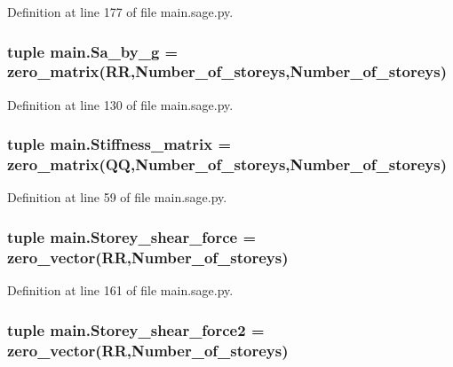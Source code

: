Definition at line 177 of file main.\+sage.\+py.

\hypertarget{namespacemain_a01374e7fea2c00172c845c7a5c71cfae}{}
\subsubsection[{Sa\+\_\+by\+\_\+g}]{\setlength{\rightskip}{0pt plus 5cm}tuple main.\+Sa\+\_\+by\+\_\+g = zero\+\_\+matrix(R\+R,Number\+\_\+of\+\_\+storeys,Number\+\_\+of\+\_\+storeys)}\label{namespacemain_a01374e7fea2c00172c845c7a5c71cfae}


Definition at line 130 of file main.\+sage.\+py.

\hypertarget{namespacemain_a0011be18dbc87087d6aaf28802f121c0}{}
\subsubsection[{Stiffness\+\_\+matrix}]{\setlength{\rightskip}{0pt plus 5cm}tuple main.\+Stiffness\+\_\+matrix = zero\+\_\+matrix(Q\+Q,Number\+\_\+of\+\_\+storeys,Number\+\_\+of\+\_\+storeys)}\label{namespacemain_a0011be18dbc87087d6aaf28802f121c0}


Definition at line 59 of file main.\+sage.\+py.

\hypertarget{namespacemain_aaa52e7055409dcf0785880422294a704}{}
\subsubsection[{Storey\+\_\+shear\+\_\+force}]{\setlength{\rightskip}{0pt plus 5cm}tuple main.\+Storey\+\_\+shear\+\_\+force = zero\+\_\+vector(R\+R,Number\+\_\+of\+\_\+storeys)}\label{namespacemain_aaa52e7055409dcf0785880422294a704}


Definition at line 161 of file main.\+sage.\+py.

\hypertarget{namespacemain_ad9f40bb3020e00eecaf17c078a1e61b6}{}
\subsubsection[{Storey\+\_\+shear\+\_\+force2}]{\setlength{\rightskip}{0pt plus 5cm}tuple main.\+Storey\+\_\+shear\+\_\+force2 = zero\+\_\+vector(R\+R,Number\+\_\+of\+\_\+storeys)}\label{namespacemain_ad9f40bb3020e00eecaf17c078a1e61b6}


